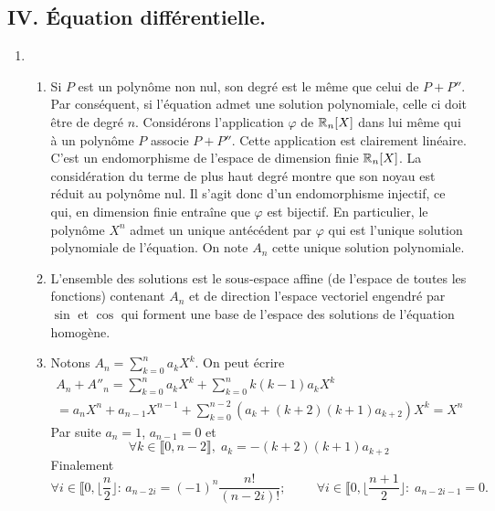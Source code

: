 \subsection*{IV. \'Equation différentielle.}
\begin{enumerate}
  \item
\begin{enumerate}
  \item Si $P$ est un polynôme non nul, son degré est le même que celui de $P+P''$. Par conséquent, si l'équation admet une solution polynomiale, celle ci doit être de degré $n$.\newline
  Considérons l'application $\varphi$ de $\mathbb{R}_n[X]$ dans lui même qui à un polynôme $P$ associe $P+P''$. Cette application est clairement linéaire. C'est un endomorphisme de l'espace de dimension finie $\mathbb{R}_n[X]$. La considération du terme de plus haut degré montre que son noyau est réduit au polynôme nul. Il s'agit donc d'un endomorphisme injectif, ce qui, en dimension finie entraîne que $\varphi$ est bijectif.\newline
  En particulier, le polynôme $X^n$ admet un unique antécédent par $\varphi$ qui est l'unique solution polynomiale de l'équation. On note $A_n$ cette unique solution polynomiale.
  \item L'ensemble des solutions est le sous-espace affine (de l'espace de toutes les fonctions) contenant $A_n$ et de direction l'espace vectoriel engendré par $\sin$ et $\cos$ qui forment une base de l'espace des solutions de l'équation homogène. 
  \item Notons $A_n=\sum_{k=0}^{n} a_kX^k$. On peut écrire 
\begin{multline*} 
A_n+A''_n = 
\sum_{k=0}^{n} a_kX^k + \sum_{k=0}^{n} k(k-1)a_kX^k \\
= a_nX^n+a_{n-1}X^{n-1}  +\sum_{k=0}^{n-2}(a_k+(k+2)(k+1)a_{k+2})X^k = X^n 
\end{multline*}
Par suite $a_n=1$, $a_{n-1}=0$ et
\begin{displaymath}
\forall k \in\llbracket 0, n-2\rrbracket,\; a_k=-(k+2)(k+1)a_{k+2}   
\end{displaymath} 
Finalement  
\begin{displaymath}
\forall i \in\llbracket 0, \lfloor \frac{n}{2}\rfloor:\, a_{n-2i}=  (-1)^n \frac{n!}{(n-2i)!}
;\hspace{1cm}
\forall i \in \llbracket 0, \lfloor \frac{n+1}{2}\rfloor:\;a_{n-2i-1}=0 .
\end{displaymath}  
\end{enumerate}


\end{enumerate}
